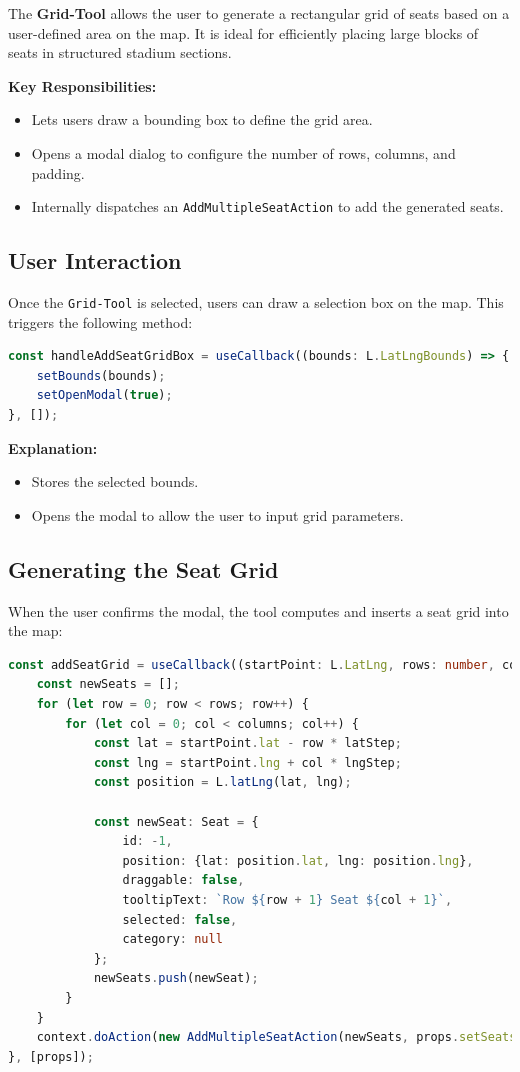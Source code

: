 The \textbf{Grid-Tool} allows the user to generate a rectangular grid of seats based on a user-defined area on the map. It is ideal for efficiently placing large blocks of seats in structured stadium sections.

\textbf{Key Responsibilities:}
\begin{itemize}
    \item Lets users draw a bounding box to define the grid area.
    \item Opens a modal dialog to configure the number of rows, columns, and padding.
    \item Internally dispatches an \texttt{AddMultipleSeatAction} to add the generated seats.
\end{itemize}

\subsection{User Interaction}
Once the \texttt{Grid-Tool} is selected, users can draw a selection box on the map. This triggers the following method:

\begin{lstlisting}[language=TypeScript, caption=Handling Box Selection, label=lst:grid-handle-box]
const handleAddSeatGridBox = useCallback((bounds: L.LatLngBounds) => {
    setBounds(bounds);
    setOpenModal(true);
}, []);
\end{lstlisting}

\textbf{Explanation:}
\begin{itemize}
    \item Stores the selected bounds.
    \item Opens the modal to allow the user to input grid parameters.
\end{itemize}

\subsection{Generating the Seat Grid}
When the user confirms the modal, the tool computes and inserts a seat grid into the map:

\begin{lstlisting}[language=TypeScript, caption=Add Grid Logic, label=lst:grid-add-seat-logic]
const addSeatGrid = useCallback((startPoint: L.LatLng, rows: number, columns: number, latStep: number, lngStep: number) => {
    const newSeats = [];
    for (let row = 0; row < rows; row++) {
        for (let col = 0; col < columns; col++) {
            const lat = startPoint.lat - row * latStep;
            const lng = startPoint.lng + col * lngStep;
            const position = L.latLng(lat, lng);

            const newSeat: Seat = {
                id: -1,
                position: {lat: position.lat, lng: position.lng},
                draggable: false,
                tooltipText: `Row ${row + 1} Seat ${col + 1}`,
                selected: false,
                category: null
            };
            newSeats.push(newSeat);
        }
    }
    context.doAction(new AddMultipleSeatAction(newSeats, props.setSeats))
}, [props]);
\end{lstlisting}

